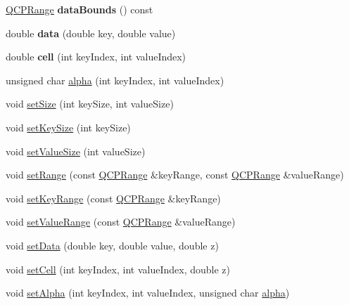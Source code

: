 \begin{DoxyCompactItemize}
\item 
\mbox{\label{classQCPColorMapData_ab7620248272c5ddd9a3f877f07179f6d}} 
\hyperlink{classQCPRange}{Q\+C\+P\+Range} {\bfseries data\+Bounds} () const
\item 
\mbox{\label{classQCPColorMapData_a2c33807b008cdb9e1394245c294c0eaf}} 
double {\bfseries data} (double key, double value)
\item 
\mbox{\label{classQCPColorMapData_af51ecd21f347adbf87b4cce4e1f5cbd6}} 
double {\bfseries cell} (int key\+Index, int value\+Index)
\item 
unsigned char \hyperlink{classQCPColorMapData_a4f7e6b7a97017400cbbd46f0660e68ea}{alpha} (int key\+Index, int value\+Index)
\item 
void \hyperlink{classQCPColorMapData_a0d9ff35c299d0478b682bfbcdd9c097e}{set\+Size} (int key\+Size, int value\+Size)
\item 
void \hyperlink{classQCPColorMapData_ac7ef70e383aface34b44dbde49234b6b}{set\+Key\+Size} (int key\+Size)
\item 
void \hyperlink{classQCPColorMapData_a0893c9e3914513048b45e3429ffd16f2}{set\+Value\+Size} (int value\+Size)
\item 
void \hyperlink{classQCPColorMapData_aad9c1c7c703c1339489fc730517c83d4}{set\+Range} (const \hyperlink{classQCPRange}{Q\+C\+P\+Range} \&key\+Range, const \hyperlink{classQCPRange}{Q\+C\+P\+Range} \&value\+Range)
\item 
void \hyperlink{classQCPColorMapData_a0738c485f3c9df9ea1241b7a8bb6a86e}{set\+Key\+Range} (const \hyperlink{classQCPRange}{Q\+C\+P\+Range} \&key\+Range)
\item 
void \hyperlink{classQCPColorMapData_ada1b2680ba96a5f4175b6d341cf75d23}{set\+Value\+Range} (const \hyperlink{classQCPRange}{Q\+C\+P\+Range} \&value\+Range)
\item 
void \hyperlink{classQCPColorMapData_afd2083ccfd6987ec94aa7ef8e91ca39a}{set\+Data} (double key, double value, double z)
\item 
void \hyperlink{classQCPColorMapData_a8e75eaf8746596319032a93f3d2d0683}{set\+Cell} (int key\+Index, int value\+Index, double z)
\item 
void \hyperlink{classQCPColorMapData_aaf7de5b34c58f38d8f4c1ceb064a876c}{set\+Alpha} (int key\+Index, int value\+Index, unsigned char \hyperlink{classQCPColorMapData_a4f7e6b7a97017400cbbd46f0660e68ea}{alpha})

\end{DoxyCompactItemize}
